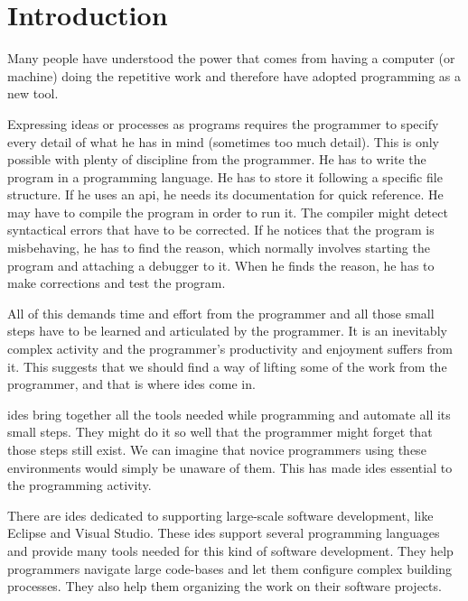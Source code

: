 \documentclass{./llncs2e/llncs}
\begin{document}
\tableofcontents

\acresetall

\section{Introduction}
	Many people have understood the power that comes from having a computer (or machine) doing the repetitive work and therefore have adopted programming as a new tool.

	Expressing ideas or processes as programs requires the programmer to specify every detail of what he has in mind (sometimes too much detail).
	This is only possible with plenty of discipline from the programmer.
	He has to write the program in a programming language.
	He has to store it following a specific file structure.
	If he uses an \ac{api}, he needs its documentation for quick reference.
	He may have to compile the program in order to run it.
	The compiler might detect syntactical errors that have to be corrected.
	If he notices that the program is misbehaving, he has to find the reason, which normally involves starting the program and attaching a debugger to it.
	When he finds the reason, he has to make corrections and test the program.

	All of this demands time and effort from the programmer and all those small steps have to be learned and articulated by the programmer.
	It is an inevitably complex activity and the programmer's productivity and enjoyment suffers from it.
	This suggests that we should find a way of lifting some of the work from the programmer, and that is where \acp{ide} come in.

	\acp{ide} bring together all the tools needed while programming and automate all its small steps.
	They might do it so well that the programmer might forget that those steps still exist.
	We can imagine that novice programmers using these environments would simply be unaware of them.
	This has made \acp{ide} essential to the programming activity.
	
	There are \acp{ide} dedicated to supporting large-scale software development, like Eclipse\cite{eclipse2007eclipse} and Visual Studio\cite{mvs2002mvs}.
	These \ac{ide}s support several programming languages and provide many tools needed for this kind of software development.
	They help programmers navigate large code-bases and let them configure complex building processes.
	They also help them organizing the work on their software projects.
	
\end{document}
